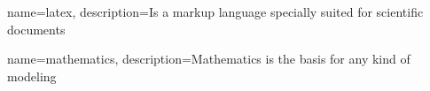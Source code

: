 \usepackage[acronym]{glossaries}
\makeglossaries





{
    name=latex,
    description={Is a markup language specially suited 
    for scientific documents}
}

{
    name=mathematics,
    description={Mathematics is the basis for any kind of modeling}
}